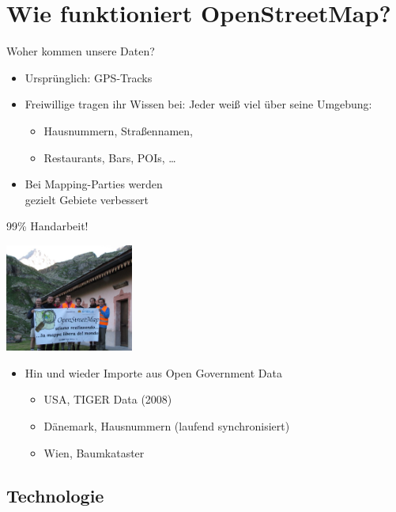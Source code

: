\documentclass[handout]{beamer}
\begin{document}
\section{Wie funktioniert OpenStreetMap?}

\begin{frame}{Woher kommen unsere Daten?}

\begin{itemize}
  \item Ursprünglich: GPS-Tracks
  \item Freiwillige tragen ihr Wissen bei: Jeder weiß viel über seine Umgebung:
	\begin{itemize}
	  \item Hausnummern, Straßennamen,
	  \item Restaurants, Bars, POIs, \dots
  \end{itemize}
  \pause
  \item Bei Mapping-Parties werden \\ gezielt Gebiete verbessert
\end{itemize}

  \vspace{0.4cm}
 99\% Handarbeit!

  \vspace*{-2.9cm}
 \hfill \includegraphics[width=4.2cm]{alps_mp.jpg}


  \pause
\begin{itemize}
  \item Hin und wieder Importe aus Open Government Data
  \begin{itemize}
    \item USA, TIGER Data (2008)
    \item Dänemark, Hausnummern (laufend synchronisiert)
    \item Wien, Baumkataster
  \end{itemize}
\end{itemize}

\end{frame}

\subsection{Technologie}
\end{document}
